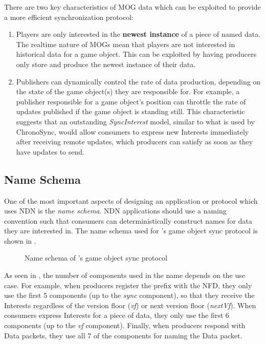 There are two key characteristics of MOG data which can be exploited to provide a more efficient synchronization protocol:
\begin{enumerate}
    \item Players are only interested in the \textbf{newest instance} of a piece of named data. The realtime nature of MOGs mean that players are not interested in historical data for a game object. This can be exploited by having producers only store and produce the newest instance of their data.
    \item Publishers can dynamically control the rate of data production, depending on the state of the game object(s) they are responsible for. For example, a publisher responsible for a game object's position can throttle the rate of updates published if the game object is standing still. This characteristic suggests that an outstanding \textit{SyncInterest} model, similar to what is used by ChronoSync, would allow consumers to express new Interests immediately after receiving remote updates, which producers can satisfy as soon as they have updates to send.
\end{enumerate}

\subsection{Name Schema}\label{sec:des:naming}
One of the most important aspects of designing an application or protocol which uses NDN is the \textit{name schema}. NDN applications should use a naming convention such that consumers can deterministically construct names for data they are interested in. The name schema used for \game{}'s game object sync protocol is shown in .

\begin{figure*}
    \centering
    \centering
    \caption{Name schema of \game{}'s game object sync protocol}
    \label{fig:des:sync-protocol-name}
    \vspace*{\floatsep}
\end{figure*}%

As seen in , the number of components used in the name depends on the use case. For example, when producers register the prefix with the NFD, they only use the first 5 components (up to the \textit{sync} component), so that they receive the Interests regardless of the version floor (\textit{vf}) or next version floor (\textit{nextVf}). When consumers express Interests for a piece of data, they only use the first 6 components (up to the \textit{vf} component). Finally, when producers respond with Data packets, they use all 7 of the components for naming the Data packet.

